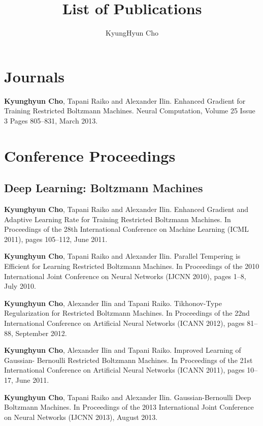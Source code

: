 \documentclass[11pt, oneside]{essay}
\title{List of Publications}
\author{KyungHyun Cho}
\begin{document}
\maketitle

\vspace{5mm}

\section{Journals}

\textbf{Kyunghyun Cho}, Tapani Raiko and Alexander Ilin. Enhanced
Gradient for Training Restricted Boltzmann Machines. Neural
Computation, Volume 25 Issue 3 Pages 805--831, March 2013.

\section{Conference Proceedings}

\subsection{Deep Learning: Boltzmann Machines}

\textbf{Kyunghyun Cho}, Tapani Raiko and Alexander Ilin. Enhanced
Gradient and Adaptive Learning Rate for Training
Restricted Boltzmann Machines. In Proceedings of the 28th
International Conference on Machine Learning (ICML 2011),
pages 105--112, June 2011.

\textbf{Kyunghyun Cho}, Tapani Raiko and Alexander Ilin. Parallel
Tempering is Efficient for Learning Restricted Boltzmann
Machines. In Proceedings of the 2010 International Joint
Conference on Neural Networks (IJCNN 2010), pages 1--8, July
2010.

\textbf{Kyunghyun Cho}, Alexander Ilin and Tapani Raiko.
Tikhonov-Type Regularization for Restricted Boltzmann
Machines. In Proceedings of the 22nd International
Conference on Artificial Neural Networks (ICANN 2012), pages
81--88, September 2012.

\textbf{Kyunghyun Cho}, Alexander Ilin and Tapani Raiko. Improved
Learning of Gaussian- Bernoulli Restricted Boltzmann
Machines. In Proceedings of the 21st International
Conference on Artificial Neural Networks (ICANN 2011), pages
10--17, June 2011.

\textbf{Kyunghyun Cho}, Tapani Raiko and Alexander Ilin.
Gaussian-Bernoulli Deep Boltzmann Machines. In Proceedings
of the 2013 International Joint Conference on Neural
Networks (IJCNN 2013), August 2013.
\end{document}
